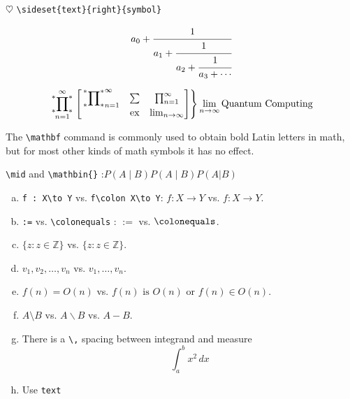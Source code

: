 \documentclass[12pt]{amsart}
\theoremstyle{plain}
\theoremstyle{definition}
\theoremstyle{remark}
\numberwithin{equation}{section} %
\newcommand{\bbZ}{\mathbb{Z}}
\DeclareMathOperator{\ex}{ex}
\begin{document}
$\heartsuit$ \verb|\sideset{text}{right}{symbol}|

\[
	a_0+\cfrac{1}{a_1+\cfrac{1}{a_2+\cfrac{1}{a_3+\cdots}}}
\]

\begin{equation}
	\sideset{_\ast^\ast}{_\ast^\ast}\prod_{n=1}^{\infty} \left.	\begin{aligned}
		\begin{bmatrix}
			\sideset{_\ast^\ast}{_\ast^\ast}\prod_{n=1}^{\infty} & \sum & \prod_{n=1}^{\infty} \\
			                                                     & \ex  & \lim_{n\to \infty}
		\end{bmatrix}
	\end{aligned} \right \rbrace \lim_{n\to \infty} \text{Quantum Computing}
\end{equation}

The \verb|\mathbf| command is commonly used to obtain bold Latin letters in math, but for most other kinds of math symbols it has no effect.

\verb|\mid| and \verb|\mathbin{}|	:$ P(A \mid B) P(A \mathbin{\vert} B )  P(A | B)  $
\begin{enumerate}[(a)]
	\item \verb|f : X\to Y| vs. \verb|f\colon X\to Y|: $ f : X\to Y $ vs. $ f\colon X\to Y $.

	\item \verb|:=| vs. \verb|\colonequals| : $ :=  $ vs. $ \colonequals $.

	\item $ \lbrace z : z \in \bbZ \rbrace $ vs. $ \lbrace z \colon z \in \bbZ \rbrace $.

	\item $ v_{1}, v_{2}, \dotsc,v_{n} $ vs. $ v_{1},\dotsc,v_{n} $.

	\item $ f(n) = O(n) $ vs. $ f(n) \text{ is } O(n)$ or $ f(n)\in O(n) $.

	\item $ A\setminus B $ vs. $ A\backslash B $ vs. $ A-B $.

	\item There is a \verb|\,| spacing between integrand and measure
	      \[ \int_{a}^{b} x^2 \,dx \]
	      
	\item Use \verb|text|
\end{enumerate}
\end{document}

